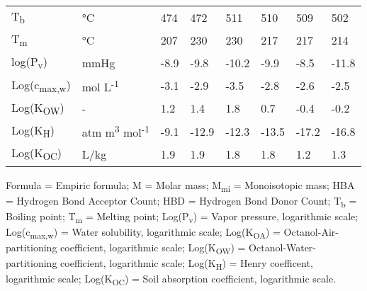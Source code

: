 \begin{table}[ht!]
\begin{threeparttable}
\begin{tabular}{llllllll}
	
	T\textsubscript{b}          & °C                                              & 474           & 472           & 511           & 510           & 509            & 502           \\
	T\textsubscript{m}          & °C                                              & 207           & 230           & 230           & 217           & 217            & 214           \\
	log(P\textsubscript{v})     & mmHg                                             & -8.9          & -9.8          & -10.2         & -9.9          & -8.5           & -11.8         \\
	Log(c\textsubscript{max,w}) & mol L\textsuperscript{-1}                        & -3.1          & -2.9          & -3.5          & -2.8          & -2.6           & -2.5          \\
	Log(K\textsubscript{OW})    & -                                                & 1.2           & 1.4           & 1.8           & 0.7           & -0.4           & -0.2          \\
	Log(K\textsubscript{H})     & atm m\textsuperscript{3} mol\textsuperscript{-1} & -9.1          & -12.9         & -12.3         & -13.5         & -17.2          & -16.8         \\
	Log(K\textsubscript{OC})    & L/kg                                             & 1.9           & 1.9           & 1.8           & 1.8           & 1.2            & 1.3           \\
	\bottomrule
\end{tabular}
\label{table:Aflatoxin_properties}
            \begin{tablenotes}[flushleft]
                \setlength{}
                \footnotesize 
                \item Formula = Empiric formula; M = Molar mass; M\textsubscript{mi} = Monoisotopic mass; HBA = Hydrogen Bond Acceptor Count; HBD = Hydrogen Bond Donor Count; T\textsubscript{b} = Boiling point; T\textsubscript{m} = Melting point; Log(P\textsubscript{v}) = Vapor pressure, logarithmic scale; Log(c\textsubscript{max,w}) = Water solubility, logarithmic scale; Log(K\textsubscript{OA}) = Octanol-Air-partitioning coefficient, logarithmic scale; Log(K\textsubscript{OW}) = Octanol-Water-partitioning coefficient, logarithmic scale; Log(K\textsubscript{H}) = Henry coefficent, logarithmic scale; Log(K\textsubscript{OC}) = Soil absorption coefficient, logarithmic scale. 
            \end{tablenotes}
        \end{threeparttable}
    \end{table}